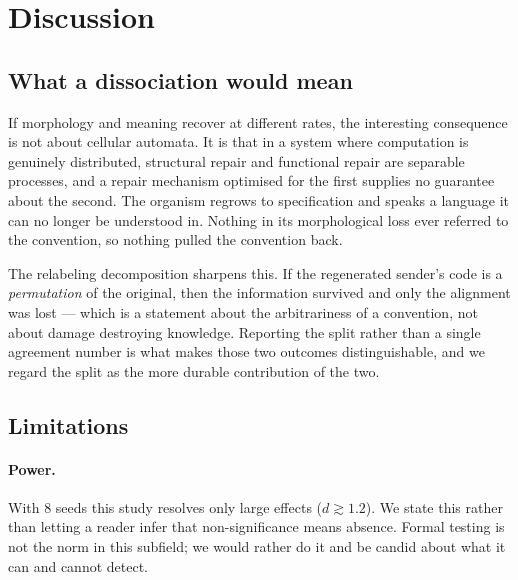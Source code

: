 \section{Discussion}
\label{sec:discussion}


\subsection{What a dissociation would mean}

If morphology and meaning recover at different rates, the interesting consequence
is not about cellular automata. It is that in a system where computation is
genuinely distributed, structural repair and functional repair are separable
processes, and a repair mechanism optimised for the first supplies no guarantee
about the second. The organism regrows to specification and speaks a language it
can no longer be understood in. Nothing in its morphological loss ever referred
to the convention, so nothing pulled the convention back.

The relabeling decomposition sharpens this. If the regenerated sender's code is a
\emph{permutation} of the original, then the information survived and only the
alignment was lost --- which is a statement about the arbitrariness of a
convention, not about damage destroying knowledge. Reporting the split rather
than a single agreement number is what makes those two outcomes distinguishable,
and we regard the split as the more durable contribution of the two.

\subsection{Limitations}

\paragraph{Power.} With 8 seeds this study resolves only large effects
($d \gtrsim 1.2$). We state this rather than letting a reader infer that
non-significance means absence. Formal testing is not the norm in this subfield;
we would rather do it and be candid about what it can and cannot detect.


